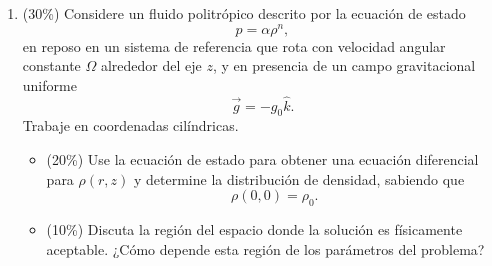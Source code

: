 \documentclass[12pt]{article}
\begin{document}
\begin{enumerate}
    \item (30\%) Considere un fluido politrópico descrito por la ecuación de estado
    \[
    p = \alpha \rho^n,
    \]
    en reposo en un sistema de referencia que rota con velocidad angular constante $\Omega$ alrededor del eje $z$, y en presencia de un campo gravitacional uniforme
    \[
    \vec{g} = -g_0 \hat{k}.
    \]
    Trabaje en coordenadas cilíndricas.
    \begin{itemize}
        \item[a)] (20\%) Use la ecuación de estado para obtener una ecuación diferencial para $\rho(r, z)$ y determine la distribución de densidad, sabiendo que
        \[
        \rho(0, 0) = \rho_0.
        \]
        \item[b)] (10\%) Discuta la región del espacio donde la solución es físicamente aceptable. ¿Cómo depende esta región de los parámetros del problema?
    \end{itemize}
\end{enumerate}
\end{document}
